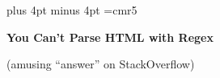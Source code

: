 \parskip 10pt plus 4pt minus 4pt\parindent=0pt%
\lineskiplimit=-1000pt%
\font\lil=cmr5%
\def\rayz#1#2{\llap{\raise #1\hbox{#2}}}%
\def\rayzl#1#2{\llap{\raise #1\hbox{\lil #2}}}%
\def\strike#1{\rlap{\raise 0.7ex\hbox{\vrule height 0.5pt width #1}}}%
\def\graybox#1{\rlap{\special{color push rgb 0.8 0.8 0.8}%
\lower 2pt\hbox{\vrule height 2ex width #1}\special{color pop}}}
\centerline{\bf You Can't Parse HTML with Regex}
\centerline{(amusing ``answer'' on StackOverflow)}

\bigskip

